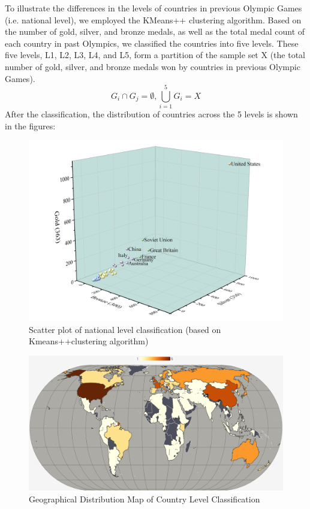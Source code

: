 \documentclass[12pt]{article}  %
\begin{document}
To illustrate the differences in the levels of countries in previous Olympic Games (i.e. national level), we employed the KMeans++ clustering algorithm. Based on the number of gold, silver, and bronze medals, as well as the total medal count of each country in past Olympics, we classified the countries into five levels. These five levels, L1, L2, L3, L4, and L5, form a partition of the sample set X (the total number of gold, silver, and bronze medals won by countries in previous Olympic Games).
\begin{equation}
G_{i} \cap G_{j}=\emptyset, \bigcup_{i=1}^{5} G_{i}=X
\end{equation}
After the classification, the distribution of countries across the 5 levels is shown in the figures:
\begin{figure}[htbp]
	\centering
	\includegraphics[width=12cm]{img/Level1.png}
	\caption{Scatter plot of national level classification (based on Kmeans++clustering algorithm)}
	\label{fig:aa}
\end{figure}

\begin{figure}[htbp]
	\centering
	\includegraphics[width=12cm]{img/Level2.png}
	\caption{Geographical Distribution Map of Country Level Classification}
	\label{fig:aa}
\end{figure}
\end{document}
